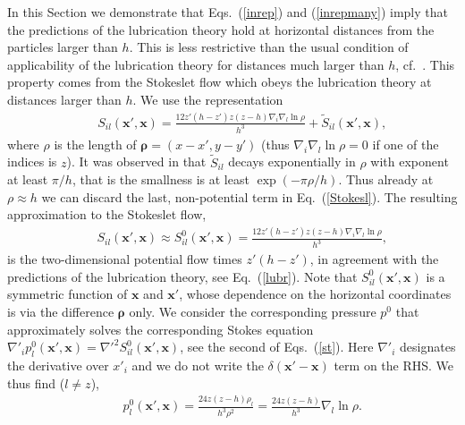 In this Section we demonstrate that Eqs.~(\ref{inrep}) and (\ref{inrepmany}) imply that the predictions of the lubrication theory hold at horizontal distances from the particles larger than $h$. This is less restrictive than the usual condition of applicability of the lubrication theory for distances much larger than $h$, cf.\ \cite{is}. This property comes from the Stokeslet flow which obeys the lubrication theory at distances larger than $h$. We use the representation
\begin{eqnarray}&&\!\!\!\!\!\!\!\!\!\!
S_{il}(\bm x', \bm x)\!=\!\frac{12 z'(h\!-\!z')z(z\!-\!h)\nabla_i\nabla_l  \ln \rho}{h^3}\!+\!{\tilde S}_{il}(\bm x', \bm x),\label{Stokesl}
\end{eqnarray}
where $\rho$ is the length of $\bm \rho\!=\!(x-x', y-y')$ (thus $\nabla_i\nabla_l  \ln \rho=0$ if one of the indices is $z$). It was observed in \cite{LironMochon}
that ${\tilde S}_{il}$ decays exponentially in $\rho$ with exponent at least $\pi/h$, that is the smallness is at least $\exp(-\pi\rho/h)$.
Thus already at $\rho\approx h$ we can discard the last, non-potential term in Eq.~(\ref{Stokesl}). The resulting approximation to the Stokeslet flow,
\begin{eqnarray}&&\!\!\!\!\!\!\!\!\!\!
S_{il}(\bm x', \bm x)\!\approx\! S^0_{il}(\bm x', \bm x)\!= \!\frac{12 z'(h\!-\!z')z(z\!-\!h)\nabla_i\nabla_l  \ln \rho}{h^3},\label{so}%
\end{eqnarray}
is the two-dimensional potential flow times $z'(h-z')$, in agreement with the predictions of the lubrication theory, see Eq.~(\ref{lubr}). Note  that $S^0_{il}(\bm x', \bm x)$ is a symmetric function of $\bm x$ and
$\bm x'$, whose dependence on the horizontal coordinates is via the difference $\bm \rho$ only. We consider the corresponding pressure $p^0$ that approximately solves the corresponding Stokes equation
$\nabla'_i p^0_l(\bm x', \bm x)\!=\!\nabla'^2 S^0_{il}(\bm x', \bm x)$, see the second of Eqs.~(\ref{st}). Here $\nabla'_i$ designates the derivative over $x'_i$ and we do not write the $\delta(\bm x'-\bm x)$ term on the RHS. We thus find ($l\neq z$),
\begin{eqnarray}&&
p^0_l(\bm x', \bm x)=\frac{24 z(z-h)\rho_l}{h^3 \rho^2}=\frac{24z(z-h)}{ h^3}\nabla_l\ln \rho.
\end{eqnarray}
